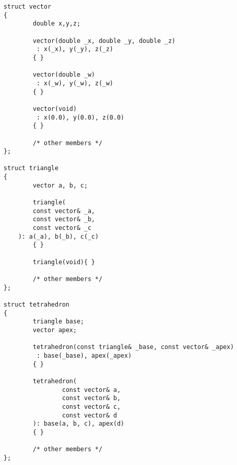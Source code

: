 \begin{verbatim}
struct vector
{
        double x,y,z;

        vector(double _x, double _y, double _z)
         : x(_x), y(_y), z(_z)
        { }

        vector(double _w)
         : x(_w), y(_w), z(_w)
        { }

        vector(void)
         : x(0.0), y(0.0), z(0.0)
        { }

        /* other members */
};

struct triangle
{
        vector a, b, c;

        triangle(
		const vector& _a,
		const vector& _b,
		const vector& _c
	): a(_a), b(_b), c(_c)
        { }

        triangle(void){ }

        /* other members */
};

struct tetrahedron
{
        triangle base;
        vector apex;

        tetrahedron(const triangle& _base, const vector& _apex)
         : base(_base), apex(_apex)
        { }

        tetrahedron(
                const vector& a,
                const vector& b,
                const vector& c,
                const vector& d
        ): base(a, b, c), apex(d)
        { }

        /* other members */
};

\end{verbatim}

